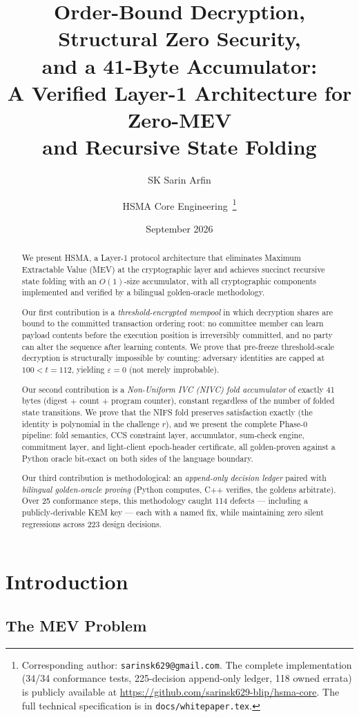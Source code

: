 \documentclass[11pt,a4paper]{article}
\title{Order-Bound Decryption, Structural Zero Security,\\ and a 41-Byte Accumulator:\\
\large A Verified Layer-1 Architecture for Zero-MEV\\ and Recursive State Folding}
\author{SK Sarin Arfin \and HSMA Core Engineering\
\thanks{Corresponding author: \texttt{sarinsk629@gmail.com}. The complete implementation
(34/34 conformance tests, 225-decision append-only ledger, 118 owned errata) is publicly
available at \url{https://github.com/sarinsk629-blip/hsma-core}. The full technical
specification is in \texttt{docs/whitepaper.tex}.}}
\date{September 2026}
\begin{document}
\maketitle

\begin{abstract}
We present HSMA, a Layer-1 protocol architecture that eliminates Maximum
Extractable Value (MEV) at the cryptographic layer and achieves succinct
recursive state folding with an $O(1)$-size accumulator, with all
cryptographic components implemented and verified by a bilingual
golden-oracle methodology.

Our first contribution is a \emph{threshold-encrypted mempool} in which
decryption shares are bound to the committed transaction ordering root:
no committee member can learn payload contents before the execution
position is irreversibly committed, and no party can alter the sequence
after learning contents. We prove that pre-freeze threshold-scale
decryption is structurally impossible by counting: adversary identities
are capped at $100 < t = 112$, yielding $\varepsilon = 0$ (not merely
improbable).

Our second contribution is a \emph{Non-Uniform IVC (NIVC) fold
accumulator} of exactly 41 bytes (digest $+$ count $+$ program counter),
constant regardless of the number of folded state transitions. We prove
that the NIFS fold preserves satisfaction exactly (the identity is
polynomial in the challenge $r$), and we present the complete
Phase-0 pipeline: fold semantics, CCS constraint layer, accumulator,
sum-check engine, commitment layer, and light-client epoch-header
certificate, all golden-proven against a Python oracle bit-exact on both
sides of the language boundary.

Our third contribution is methodological: an \emph{append-only decision
ledger} paired with \emph{bilingual golden-oracle proving} (Python computes,
C++ verifies, the goldens arbitrate). Over 25 conformance steps, this
methodology caught 114 defects --- including a publicly-derivable KEM key
--- each with a named fix, while maintaining zero silent regressions
across 223 design decisions.

\end{abstract}

\section{Introduction}

\subsection{The MEV Problem}
\end{document}
